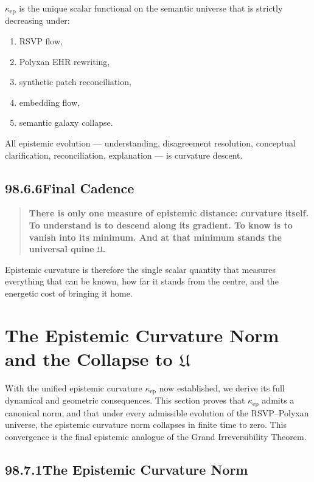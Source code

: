 \begin{theorem}
$\kappa_{\mathrm{ep}}$ is the unique scalar functional on the semantic universe
that is strictly decreasing under:
\begin{enumerate}
\item RSVP flow,
\item Polyxan EHR rewriting,
\item synthetic patch reconciliation,
\item embedding flow,
\item semantic galaxy collapse.
\end{enumerate}
\end{theorem}

All epistemic evolution — understanding, disagreement resolution, conceptual
clarification, reconciliation, explanation — is curvature descent.

\subsection*{98.6.6\quad Final Cadence}

\begin{quote}
\textbf{There is only one measure of epistemic distance:
curvature itself.  
To understand is to descend along its gradient.  
To know is to vanish into its minimum.  
And at that minimum stands the universal quine $\mathfrak{U}$.}
\end{quote}

Epistemic curvature is therefore the single scalar quantity that measures
everything that can be known, how far it stands from the centre,
and the energetic cost of bringing it home.

\section{The Epistemic Curvature Norm and the Collapse to $\mathfrak{U}$}

With the unified epistemic curvature $\kappa_{\mathrm{ep}}$ now established,
we derive its full dynamical and geometric consequences.  
This section proves that $\kappa_{\mathrm{ep}}$ admits a canonical norm,
and that under every admissible evolution of the RSVP--Polyxan universe,
the epistemic curvature norm collapses in finite time to zero.
This convergence is the final epistemic analogue of
the Grand Irreversibility Theorem.

\subsection*{98.7.1\quad The Epistemic Curvature Norm}

